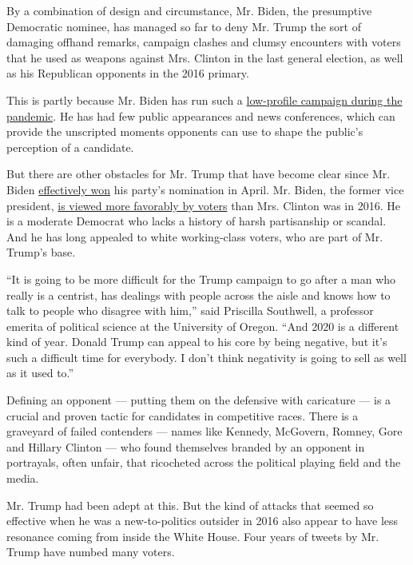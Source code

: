 By a combination of design and circumstance, Mr. Biden, the presumptive
Democratic nominee, has managed so far to deny Mr. Trump the sort of
damaging offhand remarks, campaign clashes and clumsy encounters with
voters that he used as weapons against Mrs. Clinton in the last general
election, as well as his Republican opponents in the 2016 primary.

This is partly because Mr. Biden has run such a
\href{https://www.nytimes.com/2020/06/25/us/politics/biden-speech-trump-coronavirus.html}{low-profile
campaign during the pandemic}. He has had few public appearances and
news conferences, which can provide the unscripted moments opponents can
use to shape the public's perception of a candidate.

But there are other obstacles for Mr. Trump that have become clear since
Mr. Biden
\href{https://www.nytimes.com/2020/04/08/us/politics/bernie-sanders-drops-out.html}{effectively
won} his party's nomination in April. Mr. Biden, the former vice
president,
\href{https://www.nytimes.com/2020/06/24/us/politics/trump-biden-poll-nyt-upshot-siena-college.html}{is
viewed more favorably by voters} than Mrs. Clinton was in 2016. He is a
moderate Democrat who lacks a history of harsh partisanship or scandal.
And he has long appealed to white working-class voters, who are part of
Mr. Trump's base.

``It is going to be more difficult for the Trump campaign to go after a
man who really is a centrist, has dealings with people across the aisle
and knows how to talk to people who disagree with him,'' said Priscilla
Southwell, a professor emerita of political science at the University of
Oregon. ``And 2020 is a different kind of year. Donald Trump can appeal
to his core by being negative, but it's such a difficult time for
everybody. I don't think negativity is going to sell as well as it used
to.''

Defining an opponent --- putting them on the defensive with caricature
--- is a crucial and proven tactic for candidates in competitive races.
There is a graveyard of failed contenders --- names like Kennedy,
McGovern, Romney, Gore and Hillary Clinton --- who found themselves
branded by an opponent in portrayals, often unfair, that ricocheted
across the political playing field and the media.

Mr. Trump had been adept at this. But the kind of attacks that seemed so
effective when he was a new-to-politics outsider in 2016 also appear to
have less resonance coming from inside the White House. Four years of
tweets by Mr. Trump have numbed many voters.

